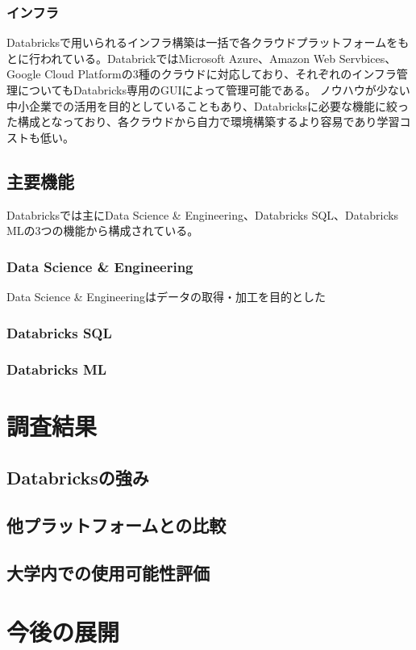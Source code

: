 \documentclass[twocolumn]{jsarticle}
\begin{document}
\subsubsection{インフラ}
Databricksで用いられるインフラ構築は一括で各クラウドプラットフォームをもとに行われている。DatabrickではMicrosoft Azure、Amazon Web Servbices、 Google Cloud Platformの3種のクラウドに対応しており、それぞれのインフラ管理についてもDatabricks専用のGUIによって管理可能である。
ノウハウが少ない中小企業での活用を目的としていることもあり、Databricksに必要な機能に絞った構成となっており、各クラウドから自力で環境構築するより容易であり学習コストも低い。
\subsection{主要機能}
Databricksでは主にData Science \& Engineering、Databricks SQL、Databricks MLの3つの機能から構成されている。
\subsubsection{Data Science \& Engineering}
Data Science \& Engineeringはデータの取得・加工を目的とした
\subsubsection{Databricks SQL}
\subsubsection{Databricks ML}
\section{調査結果}
\subsection{Databricksの強み}
\subsection{他プラットフォームとの比較}
\subsection{大学内での使用可能性評価}
\section{今後の展開}
\end{document}
